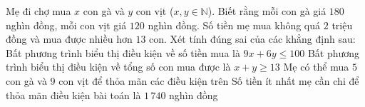 \begin{ex}%
	Mẹ đi chợ mua $x$ con gà và $y$ con vịt ($x,y\in\mathbb{N}$). Biết rằng mỗi con gà giá $180$ nghìn đồng, mỗi con vịt giá $120$ nghìn đồng. Số tiền mẹ mua không quá $2$ triệu đồng và mua được nhiều hơn $13$ con. Xét tính đúng sai của các khẳng định sau:
	\choiceTF
		{\True Bất phương trình biểu thị điều kiện về số tiền mua là $9x+6y\le 100$}
		{Bất phương trình biểu thị điều kiện về tổng số con mua được là $x+y\ge 13$}
		{\True Mẹ có thể mua $5$ con gà và $9$ con vịt để thỏa mãn các điều kiện trên}
		{Số tiền ít nhất mẹ cần chi để thỏa mãn điều kiện bài toán là $1\,740$ nghìn đồng}
\end{ex}


